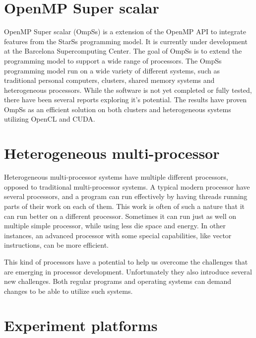 \section[OmpSs]{OpenMP Super scalar}
OpenMP Super scalar (OmpSs) is a extension of the OpenMP API to integrate features from the StarSs programming model.
It is currently under development at the Barcelona Supercomputing Center.
The goal of OmpSs is to extend the programming model to support a wide range of processors.
The OmpSs programming model run on a wide variety of different systems, such as traditional personal computers, clusters, shared memory systems and heterogeneous processors.
While the software is not yet completed or fully tested, there have been several reports exploring it's potential.
The results have proven OmpSs as an efficient solution on both clusters and heterogeneous systems utilizing OpenCL and CUDA.


\section{Heterogeneous multi-processor}
Heterogeneous multi-processor systems have multiple different processors, opposed to traditional multi-processor systems.
A typical modern processor have several processors, and a program can run effectively by having threads running parts of their work on each of them.
This work is often of such a nature that it can run better on a different processor.
Sometimes it can run just as well on multiple simple processor, while using less die space and energy.
In other instances, an advanced processor with some special capabilities, like vector instructions, can be more efficient.

This kind of processors have a potential to help us overcome the challenges that are emerging in processor development.
Unfortunately they also introduce several new challenges.
Both regular programs and operating systems can demand changes to be able to utilize such systems.

\section{Experiment platforms}

